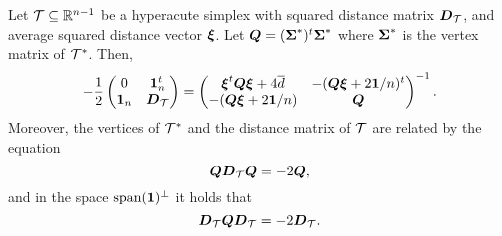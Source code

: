 \begin{lemma}
	\label{lem:block_inverse_simplex}
	Let $\mathcal{T}\subseteq\mathbb{R}^{n-1}$ be a hyperacute simplex with  squared distance matrix $\vb*{D}_{\mathcal{T}}$, and average squared distance vector $\vb*{\xi}$.
	Let $\vb*{Q}=(\boldsymbol{\Sigma}^*)^t\boldsymbol{\Sigma}^*$  where $\boldsymbol{\Sigma}^*$ is the vertex matrix of $\mathcal{T}^*$.  Then, 
	\begin{equation}
	\label{eq:simplex_block_matrix}
	-\frac{1}{2} \begin{pmatrix}
	0 & \vb{1}_n^t \\ 
	\vb{1}_n &  \vb*{D}_{\mathcal{T}}
	\end{pmatrix} = \begin{pmatrix}
	\vb*{\xi}^t \vb*{Q}\vb*{\xi} + 4\overline{d} & -(\vb*{Q}\vb*{\xi} + 2\vb{1}/n)^t \\
	-(\vb*{Q}\vb*{\xi} + 2\vb{1}/n) & \vb*{Q}
	\end{pmatrix}^{-1}.
	\end{equation}
	Moreover, the vertices of $\mathcal{T}^*$ and the distance matrix of $\mathcal{T}$ are related by the equation
	\begin{equation}
	\label{eq:lem_inverse_relation}
	\vb*{Q} \vb*{D}_{\mathcal{T}} \vb*{Q} = -2\vb*{Q},
	\end{equation}
	and in the space $\textnormal{span}(\vb{1})^\perp$ it holds that 
	\begin{equation*}
	\label{eq:lem_inverse_relation2}
	\vb*{D}_{\mathcal{T}}\vb*{Q} \vb*{D}_{\mathcal{T}}= -2\vb*{D}_{\mathcal{T}}.	
	\end{equation*}
\end{lemma}

